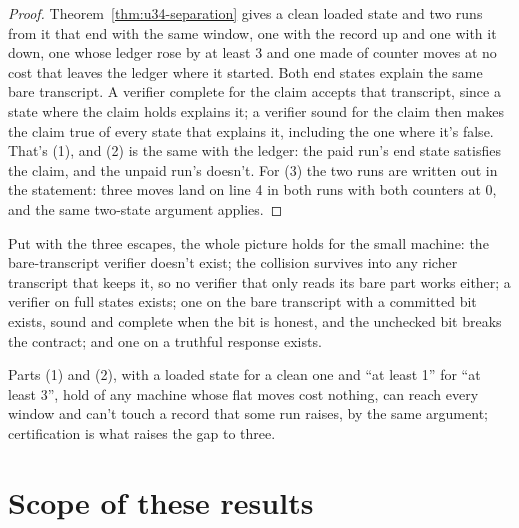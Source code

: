 \documentclass[11pt,twoside]{article}
\theoremstyle{thielethm}
\theoremstyle{thieledef}
\theoremstyle{thieledef}
\theoremstyle{thieledef}
\theoremstyle{thielethm}
\theoremstyle{thieleobs}
\theoremstyle{thielethm}
\begin{document}
\begin{proof}
Theorem~\ref{thm:u34-separation} gives a clean loaded state and two runs from it that end with the
same window, one with the record up and one with it down, one whose ledger rose by at least 3 and
one made of counter moves at no cost that leaves the ledger where it started.
Both end states explain the same bare transcript. A verifier
complete for the claim accepts that transcript, since a state where the claim holds explains it;
a verifier sound for the claim then makes the claim true of every state that explains it,
including the one where it's false. That's (1), and (2) is the same with the ledger: the paid run's end state satisfies the claim, and the unpaid run's doesn't. For (3) the
two runs are written out in the statement: three moves land on line 4 in both runs with both
counters at 0, and the same two-state argument applies.
\end{proof}

Put with the three escapes, the whole picture holds for the small machine: the bare-transcript
verifier doesn't exist; the collision survives into any richer transcript that keeps it, so no
verifier that only reads its bare part works either; a verifier on full states exists; one on the
bare transcript with a committed bit exists, sound and complete when the bit is honest, and the
unchecked bit breaks the contract; and one on a truthful response exists.

Parts (1) and (2), with a loaded state for a clean one and ``at least 1'' for ``at least 3'', hold of any
machine whose flat moves cost nothing, can reach every window and can't touch a record that some run
raises, by the same argument; certification is what raises the gap to three.




\section{Scope of these results}
\end{document}
